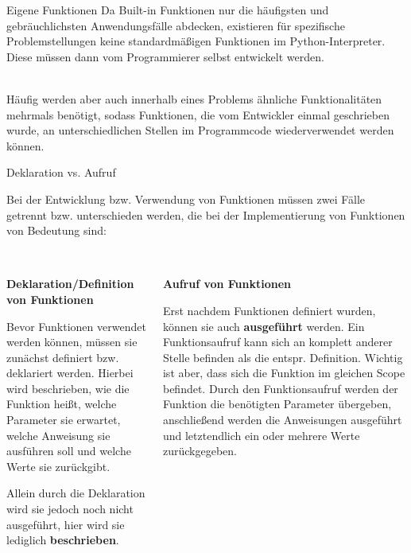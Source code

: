     \begin{frame}{Eigene Funktionen}
        Da Built-in Funktionen nur die häufigsten und gebräuchlichsten Anwendungsfälle abdecken, existieren für spezifische Problemstellungen keine standardmäßigen Funktionen im Python-Interpreter. Diese müssen dann vom Programmierer selbst entwickelt werden. \\~\
        
        Häufig werden aber auch innerhalb eines Problems ähnliche Funktionalitäten mehrmals benötigt, sodass Funktionen, die vom Entwickler einmal geschrieben wurde, an unterschiedlichen Stellen im Programmcode wiederverwendet werden können.
    \end{frame}
    
    \begin{frame}{Deklaration vs. Aufruf}
    
        Bei der Entwicklung bzw. Verwendung von Funktionen müssen zwei Fälle getrennt bzw. unterschieden werden, die bei der Implementierung von Funktionen von Bedeutung sind:\\~\
    
        
        \begin{columns}[T] %
            \begin{column}{.48\textwidth}
                \textbf{Deklaration/Definition von Funktionen} 
                
                    Bevor Funktionen verwendet werden können, müssen sie zunächst definiert bzw. deklariert werden. Hierbei wird beschrieben, wie die Funktion heißt, welche Parameter sie erwartet, welche Anweisung sie ausführen soll und welche Werte sie zurückgibt.
                    
                    Allein durch die Deklaration wird sie jedoch noch nicht ausgeführt, hier wird sie lediglich \textbf{beschrieben}.
            \end{column}%
            \hfill%
            \begin{column}{.48\textwidth}
                \textbf{Aufruf von Funktionen}
                
                Erst nachdem Funktionen definiert wurden, können sie auch \textbf{ausgeführt} werden. Ein Funktionsaufruf kann sich an komplett anderer Stelle befinden als die entspr. Definition. Wichtig ist aber, dass sich die Funktion im gleichen Scope befindet. Durch den Funktionsaufruf werden der Funktion die benötigten Parameter übergeben, anschließend werden die Anweisungen ausgeführt und letztendlich ein oder mehrere Werte zurückgegeben.
            \end{column}%
        \end{columns}
    \end{frame}
    
